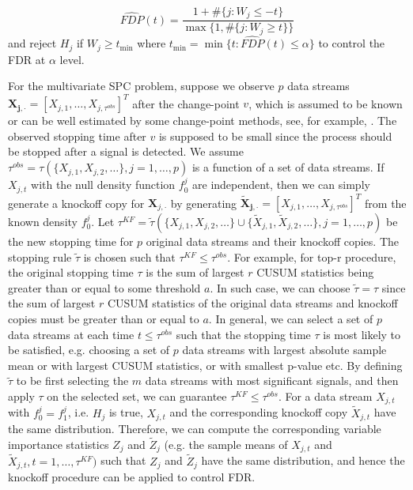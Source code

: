 \documentclass[]{interact}
\theoremstyle{plain}%
\theoremstyle{definition}
\theoremstyle{remark}
\begin{document}
\begin{equation}\label{eq1}
\widehat{FDP}(t) = \frac{1 + \# \{j: W_j \le -t\}}{\max \{1, \#\{j: W_j \ge t\}\}}
\end{equation}
and reject $H_j$ if $W_j \ge t_{\min}$ where $t_{\min} =\min \{t: \widehat{FDP}(t)  \le \alpha\}$ to control the FDR at $\alpha$ level.

For the multivariate SPC problem, suppose we observe $p$ data streams $\bm{X_{j,\cdot}} = [X_{j,1}, \ldots, X_{j,\tau^{obs}}]^T$ after the change-point $v$, which is assumed to be known or can be well estimated by some change-point methods, see, for example, \cite{zamba2006multivariate}. The observed stopping time after $v$ is supposed to be small since the process should be stopped after a signal is detected. We assume $\tau^{obs} = \tau \left( \{X_{j,1}, X_{j,2}, \ldots\}, j=1, \ldots, p \right)$ is a function of a set of data streams. If $X_{j,t}$ with the null density function $f_0^j$ are independent, then we can simply generate a knockoff copy for $\bm X_{j,\cdot}$ by generating $\bm{\tilde X_{j,\cdot}} = [X_{j,1}, \ldots, X_{j,\tau^{obs}}]^T$ from the known density $f_0^j$. Let $\tau^{KF}=\tilde \tau (\{ X_{j,1}, X_{j,2}, \ldots\} \cup \{ \tilde X_{j,1},\tilde X_{j,2},\ldots\}, j=1, \ldots, p)$ be the new stopping time for $p$ original data streams and their knockoff copies. The stopping rule $\tilde \tau$ is chosen such that $\tau^{KF} \le \tau^{obs}$. For example, for top-r procedure, the original stopping time $\tau$ is the sum of largest $r$ CUSUM statistics being greater than or equal to some threshold $a$. In such case, we can choose $\tilde\tau=\tau$ since the sum of largest $r$ CUSUM statistics of the original data streams and knockoff copies must be greater than or equal to $a$. In general, we can select a set of $p$ data streams at each time $t \le \tau^{obs}$ such that the stopping time $\tau$ is most likely to be satisfied, e.g. choosing a set of $p$ data streams with largest absolute sample mean or with largest CUSUM statistics, or with smallest p-value etc. By defining $\tilde \tau$ to be first selecting the $m$ data streams with most significant signals, and then apply $\tau$ on the selected set, we can guarantee $\tau^{KF} \le \tau^{obs}$. For a data stream $X_{j,t}$ with $f_0^j = f_1^j$, i.e. $H_j$ is true, $X_{j,t}$ and the corresponding knockoff copy $\tilde X_{j,t}$ have the same distribution. Therefore, we can compute the corresponding variable importance statistics $Z_j$ and $\tilde Z_j$ (e.g. the sample means of $X_{j,t}$ and $\tilde X_{j,t}, t=1, \ldots, \tau^{KF})$ such that $Z_j$ and $\tilde Z_j$ have the same distribution, and hence the knockoff procedure can be applied to control FDR.
\end{document}
